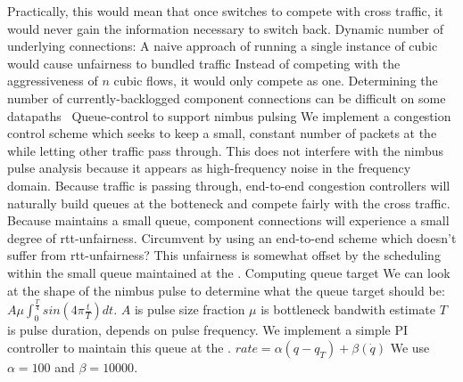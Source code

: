 \begin{outline}
            \4 Practically, this would mean that once \inbox switches to compete with cross traffic, it would never gain the information necessary to switch back.
        \3 Dynamic number of underlying connections: A naive approach of running a single instance of cubic would cause unfairness to bundled traffic
            \4 Instead of competing with the aggressiveness of $n$ cubic flows, it would only compete as one.
            \4 Determining the number of currently-backlogged component connections can be difficult on some datapaths~\cite{heavy-hitters}
\1 Queue-control to support nimbus pulsing
    \2 We implement a congestion control scheme which seeks to keep a small, constant number of packets at the \inbox while letting other traffic pass through.
        \3 This does not interfere with the nimbus pulse analysis because it appears as high-frequency noise in the frequency domain.
        \3 Because traffic is passing through, end-to-end congestion controllers will naturally build queues at the botteneck and compete fairly with the cross traffic.
        \3 Because \inbox maintains a small queue, component connections will experience a small degree of rtt-unfairness.
            \4 Circumvent by using an end-to-end scheme which doesn't suffer from rtt-unfairness?
        \3 This unfairness is somewhat offset by the scheduling within the small queue maintained at the \inbox.
\1 Computing \inbox queue target
    \2 We can look at the shape of the nimbus pulse to determine what the queue target should be: $A \mu \int_0^{\frac{T}{4}} sin(4 \pi \frac{t}{T}) dt$.
        \3 $A$ is pulse size fraction
        \3 $\mu$ is bottleneck bandwith estimate
        \3 $T$ is pulse duration, depends on pulse frequency.
\1 We implement a simple PI controller to maintain this queue at the \inbox.
    \2 $rate = \alpha (q - q_T) + \beta (\dot{q})$
        \3 We use $\alpha = 100$ and $\beta = 10000$.
\end{outline}
